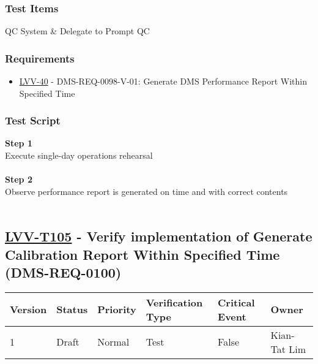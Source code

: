 \hypertarget{test-items-80}{%
\subsubsection{Test Items}\label{test-items-80}}

QC System \& Delegate to Prompt QC

\hypertarget{requirements-81}{%
\subsubsection{Requirements}\label{requirements-81}}

\begin{itemize}
\tightlist
\item
  \href{https://jira.lsstcorp.org/browse/LVV-40}{LVV-40} -
  DMS-REQ-0098-V-01: Generate DMS Performance Report Within Specified
  Time
\end{itemize}

\hypertarget{test-script-81}{%
\subsubsection{Test Script}\label{test-script-81}}

\textbf{Step 1}\\
Execute single-day operations rehearsal\\
~\\
\textbf{Step 2}\\
Observe performance report is generated on time and with correct
contents\\
~\\

\hypertarget{lvv-t105---verify-implementation-of-generate-calibration-report-within-specified-time-dms-req-0100}{%
\subsection{\texorpdfstring{\href{https://jira.lsstcorp.org/secure/Tests.jspa\#/testCase/LVV-T105}{LVV-T105}
- Verify implementation of Generate Calibration Report Within Specified
Time
(DMS-REQ-0100)}{LVV-T105 - Verify implementation of Generate Calibration Report Within Specified Time (DMS-REQ-0100)}}\label{lvv-t105---verify-implementation-of-generate-calibration-report-within-specified-time-dms-req-0100}}

\begin{longtable}[]{@{}llllll@{}}
\toprule
Version & Status & Priority & Verification Type & Critical Event &
Owner\tabularnewline
\midrule
\endhead
1 & Draft & Normal & Test & False & Kian-Tat Lim\tabularnewline
\bottomrule
\end{longtable}

